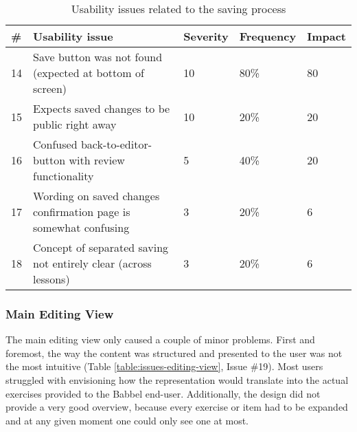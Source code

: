 \begin{table}[h!]
\centering
\begin{tabular}{|l|p{7cm}|l|l|l|}
\hline
\rowcolor[HTML]{EFEFEF}
\textbf{\#} & \textbf{Usability issue} & \textbf{Severity} & \textbf{Frequency} & \textbf{Impact} \\ \hline
14 & Save button was not found (expected at bottom of screen) & 10 & 80\% & 80 \\ \hline
15 & Expects saved changes to be public right away & 10 & 20\% & 20 \\ \hline
16 & Confused back-to-editor-button with review functionality & 5 & 40\% & 20 \\ \hline
17 & Wording on saved changes confirmation page is somewhat confusing & 3 & 20\% & 6 \\ \hline
18 & Concept of separated saving not entirely clear (across lessons) & 3 & 20\% & 6 \\ \hline
\end{tabular}
\caption{Usability issues related to the saving process}
\label{table:issues-saving-process}
\end{table}


\subsubsection{Main Editing View}
The main editing view only caused a couple of minor problems. First and foremost, the way the content was structured and presented to the user was not the most intuitive (Table \ref{table:issues-editing-view}, Issue \#19). Most users struggled with envisioning how the representation would translate into the actual exercises provided to the Babbel end-user. Additionally, the design did not provide a very good overview, because every exercise or item had to be expanded and at any given moment one could only see one at most.

